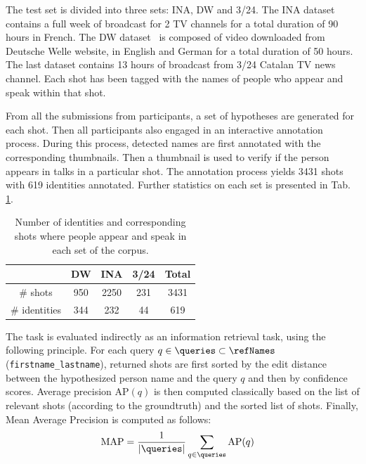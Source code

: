  The test set is divided into three sets: INA, DW and 3/24. The INA dataset contains a full week of broadcast for 2 TV channels for a total duration of 90 hours in French. The DW dataset~\cite{EUMSSI} is composed of video downloaded from Deutsche Welle website, in English and German for a total duration of 50 hours. The last dataset contains 13 hours of broadcast from 3/24 Catalan TV news channel. Each shot has been tagged with the names of people who appear and speak within that shot.

From all the submissions from participants, a set of hypotheses are generated for each shot. Then all participants also engaged in an interactive annotation process. During this process, detected names are first annotated with the corresponding thumbnails. Then a thumbnail is used to verify if the person appears in talks in a particular shot. The annotation process yields 3431 shots with 619 identities annotated. Further statistics on each set is presented in Tab. \ref{tab:stats}.

\begin{table}[tb]
\centering
\caption{Number of identities and corresponding shots where people appear and speak in each set of the corpus.}
\vspace*{-2mm}
\begin{tabular}{c|c|c|c|c|}
\cline{2-5}
    						   		& DW  	& INA 	& 3/24  & Total\\ \hline
 \multicolumn{1}{|c|}{\# shots} 		& 950	& 2250  & 231 & 3431\\ \hline

 \multicolumn{1}{|c|}{\# identities} 	& 344	& 232   & 44 & 619 \\ \hline
								
\end{tabular}
%
\vspace*{-5mm}
\label{tab:stats}
\end{table}



 The task is evaluated indirectly as an information retrieval task, using the following principle.
%
For each query $q \in \queries \subset \refNames$ (\texttt{first\-name\_lastname}), returned shots are first sorted by the edit distance between the hypothesized person name and the query $q$ and then by confidence scores.
Average precision $\text{AP}(q)$ is then computed classically based on the list of relevant shots (according to the groundtruth) and the sorted list of shots. Finally, Mean Average Precision is computed as follows:
\begin{align}
            \text{MAP} & = \frac{1}{|\queries|} \sum_{q \in \queries} \text{AP}(q) \nonumber
\end{align}

